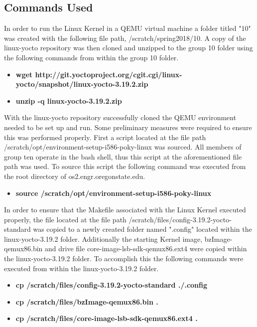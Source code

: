\documentclass[10pt,onecolumn,draftclsnofoot]{IEEEtran} %
\begin{document}
\newpage
\begin{singlespace}
\section{\bf  Commands Used}

  \normalfont \indent In order to run the Linux Kernel in a QEMU virtual machine a folder titled "10" was created with the following file path, /scratch/spring2018/10. A copy of the linux-yocto repository was then cloned and unzipped to the group 10 folder using the following commands from within the group 10 folder.

  \begin{itemize}
    \item \textbf{wget http://git.yoctoproject.org/cgit.cgi/linux-yocto/snapshot/linux-yocto-3.19.2.zip }
    \item \textbf{unzip -q linux-yocto-3.19.2.zip}
  \end{itemize}

  \normalfont \indent With the linux-yocto repository successfully cloned the QEMU environment needed to be set up and run. Some preliminary measures were required to ensure this was performed properly. First a script located at the file path /scratch/opt/environment-setup-i586-poky-linux was sourced. All members of group ten operate in the bash shell, thus this script at the aforementioned file path was used. To source this script the following command was executed from the root directory of os2.engr.oregonstate.edu.

  \begin{itemize}
    \item \textbf{source /scratch/opt/environment-setup-i586-poky-linux}
  \end{itemize}
  \normalfont \indent In order to ensure that the Makefile associated with the Linux Kernel executed properly, the file located at the file path /scratch/files/config-3.19.2-yocto-standard was copied to a newly created folder named ".config" located within the linux-yocto-3.19.2 folder. Additionally the starting Kernel image, bzImage-qemux86.bin and drive file core-image-lsb-sdk-qemux86.ext4 were copied within the linux-yocto-3.19.2 folder. To accomplish this the following commands were executed from within the linux-yocto-3.19.2 folder.

  \begin{itemize}
    \item \textbf{cp /scratch/files/config-3.19.2-yocto-standard ./.config}
    \item \textbf{cp /scratch/files/bzImage-qemux86.bin .}
    \item \textbf{cp /scratch/files/core-image-lsb-sdk-qemux86.ext4 .}
  \end{itemize}
 

\end{singlespace}
\end{document}
